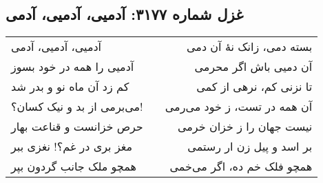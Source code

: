 \begin{center}
\section*{غزل شماره ۳۱۷۷: آدمیی، آدمیی، آدمی}
\label{sec:3177}
\begin{longtable}{l p{0.5cm} r}
آدمیی، آدمیی، آدمی
&&
بسته دمی، زانک نهٔ آن دمی
\\
آدمیی را همه در خود بسوز
&&
آن دمیی باش اگر محرمی
\\
کم زد آن ماه نو و بدر شد
&&
تا نزنی کم، نرهی از کمی
\\
می‌برمی از بد و نیک کسان؟!
&&
آن همه در تست، ز خود می‌رمی
\\
حرص خزانست و قناعت بهار
&&
نیست جهان را ز خزان خرمی
\\
مغز بری در غم؟! نغزی ببر
&&
بر اسد و پیل زن ار رستمی
\\
همچو ملک جانب گردون بپر
&&
همچو فلک خم ده، اگر می‌خمی
\\
\end{longtable}
\end{center}
